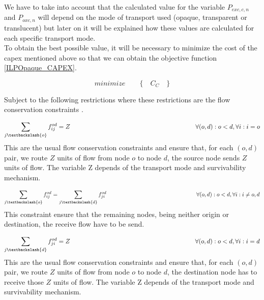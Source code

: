 \vspace{10pt}
We have to take into account that the calculated value for the variable $P_{exc,c,n}$ and $P_{oxc,n}$ will depend on the mode of transport used (opaque, transparent or translucent) but later on it will be explained how these values are calculated for each specific transport mode.\\

To obtain the best possible value, it will be necessary to minimize the cost of the capex mentioned above so that we can obtain the objective function \ref{ILPOpaque_CAPEX}.

\begin{equation}
minimize \qquad \Big\{ \quad C_C \quad \Big\}
\label{ILPOpaque_CAPEX}
\end{equation}

\vspace{11pt}
\noindent
Subject to the following restrictions where these restrictions are the flow conservation constraints \cite{teserui}.

\begin{equation}
\sum_{j\textbackslash \{o\}} f_{ij}^{od} = Z  \qquad \qquad \qquad \qquad \qquad \qquad \qquad \qquad \qquad \qquad
\forall(o,d) : o < d, \forall i: i = o
\label{ILPOpaque1_CAPEX}
\end{equation}
\noindent
This are the usual flow conservation constraints and ensure that, for each $(o,d)$ pair, we route $Z$ units of flow from node $o$ to node $d$, the source node sends $Z$ units of flow. The variable Z depends of the transport mode and survivability mechanism.

\begin{equation}
\sum_{j\textbackslash \{o\}} f_{ij}^{od} = \sum_{j\textbackslash \{d\}} f_{ji}^{od}   \qquad \qquad \qquad \qquad \qquad \qquad \qquad \qquad
\forall(o,d) : o < d, \forall i: i \neq o,d
\label{ILPOpaque2_CAPEX}
\end{equation}
\noindent
This constraint ensure that the remaining nodes, being neither origin or destination, the receive flow have to be send.

\begin{equation}
\sum_{j\textbackslash \{d\}} f_{ji}^{od} = Z  \qquad \qquad \qquad \qquad \qquad \qquad \qquad \qquad \qquad \qquad
\forall(o,d) : o < d, \forall i: i = d
\label{ILPOpaque3_CAPEX}
\end{equation}
\noindent
This are the usual flow conservation constraints and ensure that, for each $(o,d)$ pair, we route $Z$ units of flow from node $o$ to node $d$, the destination node has to receive those $Z$ units of flow. The variable Z depends of the transport mode and survivability mechanism.\\


